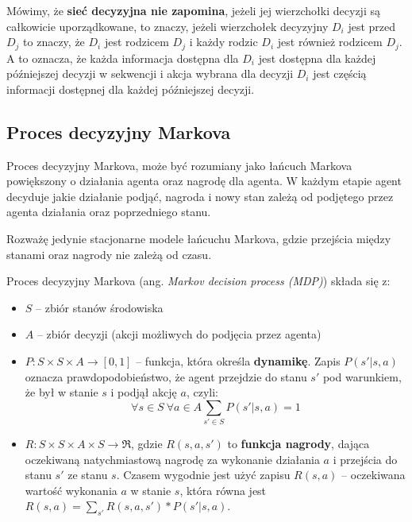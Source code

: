 \documentclass[a4paper, 12pt,oneside]{book}
\begin{document}
Mówimy, że \textbf{sieć decyzyjna nie zapomina}, jeżeli jej wierzchołki decyzji
są całkowicie uporządkowane, to znaczy, jeżeli wierzchołek decyzyjny $D_i$ jest
przed $D_j$ to znaczy, że $D_i$ jest rodzicem $D_j$ i każdy rodzic $D_i$ jest
również rodzicem $D_j$. A to oznacza, że każda informacja dostępna dla $D_i$
jest dostępna dla każdej późniejszej decyzji w sekwencji i akcja wybrana dla
decyzji $D_i$ jest częścią informacji dostępnej dla każdej późniejszej decyzji.

\subsection{Proces decyzyjny Markova}
Proces decyzyjny Markova, może być rozumiany jako łańcuch Markova powiększony o
działania agenta oraz nagrodę dla agenta. W każdym etapie agent decyduje jakie
działanie podjąć, nagroda i nowy stan zależą od podjętego przez agenta
działania oraz poprzedniego stanu. 

Rozważę jedynie stacjonarne modele łańcuchu Markova, gdzie przejścia między
stanami oraz nagrody nie zależą od czasu. 

Proces decyzyjny Markova (ang. \textit{Markov decision process (MDP)}) składa
się z:
\begin{itemize}
		\setlength\itemsep{-0.4em}
	\item $S$ -- zbiór stanów środowiska
	\item $A$ -- zbiór decyzji (akcji możliwych do podjęcia przez agenta)
	\item $P: S\times S\times A\rightarrow [0,1]$ -- funkcja, która określa
		\textbf{dynamikę}. Zapis $P(s' | s, a)$ oznacza
		prawdopodobieństwo, że agent przejdzie do stanu $s'$ pod
		warunkiem, że był w stanie $s$ i podjął akcję $a$, czyli:
		\[\forall s\in S \ \forall a\in A \sum_{s' \in S}P(s'|s,a)=1\]
	\item $R:S\times S\times A\times S \rightarrow \mathfrak{R}$, gdzie
		$R(s,a,s')$ to \textbf{funkcja nagrody}, dająca oczekiwaną
		natychmiastową nagrodę za wykonanie działania $a$ i przejścia
		do stanu $s'$ ze stanu $s$. Czasem wygodnie jest użyć zapisu
		$R(s,a)$ -- oczekiwana wartość wykonania $a$ w stanie $s$,
		która równa jest $R(s,a)=\sum _{s'}R(s,a,s') * P(s'|s,a)$.
\end{itemize}
\end{document}
